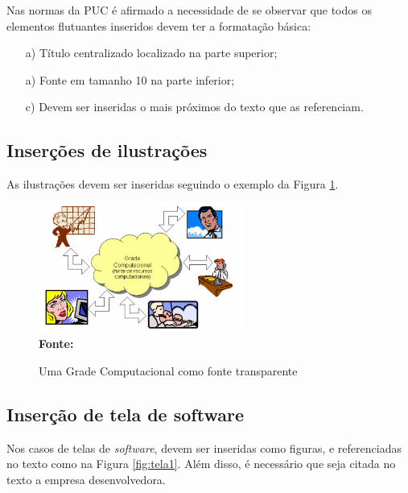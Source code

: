 Nas normas da PUC é afirmado a necessidade de se observar que todos os elementos flutuantes inseridos devem ter a formatação básica:

\begin{enumerate} 
 \item [a)] Título centralizado localizado na parte superior; 
 \item [a)] Fonte em tamanho 10 na parte inferior;
 \item [c)] Devem ser inseridas o mais próximos do texto que as referenciam.
\end{enumerate}


\subsection{\esp Inserções de ilustrações}

As ilustrações devem ser inseridas seguindo o exemplo da Figura \ref{fig:figura1}. 
\begin{figure}[ht]
	\centering	
	\caption[\hspace{0.1cm}Grade Computacional.]{Uma Grade Computacional como fonte transparente}
	\vspace{-0.4cm}
	\includegraphics[width=0.6\textwidth]{figuras/grade-comp.png}
	 \vspace{-0.2cm}
	\\\textbf{\footnotesize Fonte: \cite{cap-livro} }
	\label{fig:figura1}
\end{figure}
\vspace{-0.5cm}

\subsection{\esp Inserção de tela de software}

Nos casos de telas de \textit{software}, devem ser inseridas como figuras, e referenciadas no texto
como na Figura \ref{fig:tela1}. Além disso, é necessário que seja citada no texto a empresa desenvolvedora.

